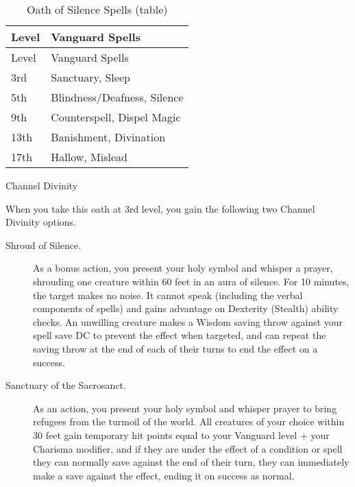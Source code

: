 \begin{longtable}[]{@{}
  >{\raggedright\arraybackslash}p{}
  >{\raggedright\arraybackslash}p{}@{}}
\caption{Oath of Silence Spells
(table)}\label{vanguard-oath-of-silence-spells}\tabularnewline
\toprule\noalign{}
\begin{minipage}[b]{\linewidth}\raggedright
Level
\end{minipage} & \begin{minipage}[b]{\linewidth}\raggedright
Vanguard Spells
\end{minipage} \\
\midrule\noalign{}
\endfirsthead
\toprule\noalign{}
\begin{minipage}[b]{\linewidth}\raggedright
Level
\end{minipage} & \begin{minipage}[b]{\linewidth}\raggedright
Vanguard Spells
\end{minipage} \\
\midrule\noalign{}
\endhead
\bottomrule\noalign{}
\endlastfoot
3rd & Sanctuary, Sleep \\
5th & Blindness/Deafness, Silence \\
9th & Counterspell, Dispel Magic \\
13th & Banishment, Divination \\
17th & Hallow, Mislead \\
\end{longtable}

Channel Divinity

When you take this oath at 3rd level, you gain the following two Channel
Divinity options.

\begin{description}
\item[Shroud of Silence.]
As a bonus action, you present your holy symbol and whisper a prayer,
shrouding one creature within 60 feet in an aura of silence. For 10
minutes, the target makes no noise. It cannot speak (including the
verbal components of spells) and gains advantage on Dexterity (Stealth)
ability checks. An unwilling creature makes a Wisdom saving throw
against your spell save DC to prevent the effect when targeted, and can
repeat the saving throw at the end of each of their turns to end the
effect on a success.
\item[Sanctuary of the Sacrosanct.]
As an action, you present your holy symbol and whisper prayer to bring
refugees from the turmoil of the world. All creatures of your choice
within 30 feet gain temporary hit points equal to your Vanguard level +
your Charisma modifier, and if they are under the effect of a condition
or spell they can normally save against the end of their turn, they can
immediately make a save against the effect, ending it on success as
normal.
\end{description}

